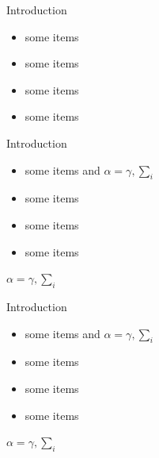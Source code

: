 \documentclass{beamer}
\begin{document}
\begin{frame}{}
\begin{columns}[T]
\begin{column}{.48\linewidth}
\begin{block}{Introduction}
\begin{itemize}
\item some items
\item some items
\item some items
\item some items
\end{itemize}
\end{block}
\begin{block}{Introduction}
\begin{itemize}
\item some items and $\alpha=\gamma, \sum_{i}$
\item some items
\item some items
\item some items
\end{itemize}
$\alpha=\gamma, \sum_{i}$
\end{block}
\begin{block}{Introduction}
\begin{itemize}
\item some items and $\alpha=\gamma, \sum_{i}$
\item some items
\item some items
\item some items
\end{itemize}
$\alpha=\gamma, \sum_{i}$
\end{block}

\end{column}
\end{columns}

\end{frame}
\end{document}
